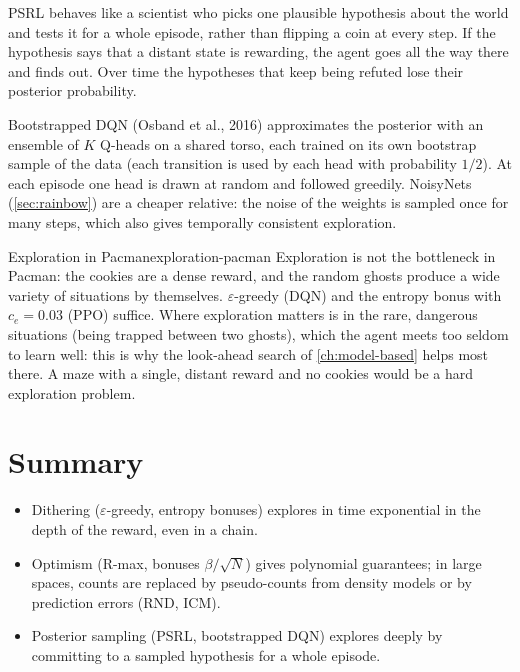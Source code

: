 \begin{intuition}
  PSRL behaves like a scientist who picks one plausible hypothesis about
  the world and tests it for a whole episode, rather than flipping a coin
  at every step. If the hypothesis says that a distant state is rewarding,
  the agent goes all the way there and finds out. Over time the hypotheses
  that keep being refuted lose their posterior probability.
\end{intuition}

Bootstrapped DQN (Osband et al., 2016) approximates the posterior with an
ensemble of $K$ Q-heads on a shared torso, each trained on its own
bootstrap sample of the data (each transition is used by each head with
probability $1/2$). At each episode one head is drawn at random and
followed greedily. NoisyNets (\cref{sec:rainbow}) are a cheaper relative:
the noise of the weights is sampled once for many steps, which also gives
temporally consistent exploration.

\begin{pacman}{Exploration in Pacman}{exploration-pacman}
  Exploration is not the bottleneck in Pacman: the cookies are a dense
  reward, and the random ghosts produce a wide variety of situations by
  themselves. $\varepsilon$-greedy (DQN) and the entropy bonus with
  $c_e = 0.03$ (PPO) suffice. Where exploration matters is in the rare,
  dangerous situations (being trapped between two ghosts), which the agent
  meets too seldom to learn well: this is why the look-ahead search of
  \cref{ch:model-based} helps most there. A maze with a single, distant
  reward and no cookies would be a hard exploration problem.
\end{pacman}

\section{Summary}

\begin{itemize}[nosep]
  \item Dithering ($\varepsilon$-greedy, entropy bonuses) explores in time
    exponential in the depth of the reward, even in a chain.
  \item Optimism (R-max, bonuses $\beta / \sqrt{N}$) gives polynomial
    guarantees; in large spaces, counts are replaced by pseudo-counts from
    density models or by prediction errors (RND, ICM).
  \item Posterior sampling (PSRL, bootstrapped DQN) explores deeply by
    committing to a sampled hypothesis for a whole episode.
\end{itemize}

